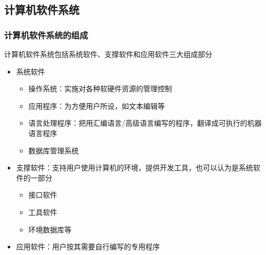 \documentclass[cs4size,a4paper,10pt]{ctexart}
\begin{document}
	\subsection{计算机软件系统}
	\subsubsection{计算机软件系统的组成}
	计算机软件系统包括系统软件、支撑软件和应用软件三大组成部分
	\begin{itemize}
		\item 系统软件
		\begin{itemize}
			\item 操作系统：实施对各种软硬件资源的管理控制
			\item 应用程序：为方便用户所设，如文本编辑等
			\item 语言处理程序：把用汇编语言/高级语言编写的程序，翻译成可执行的机器语言程序
			\item 数据库管理系统
		\end{itemize}
		\item 支撑软件：支持用户使用计算机的环境，提供开发工具，也可以认为是系统软件的一部分
		\begin{itemize}
			\item 接口软件
			\item 工具软件
			\item 环境数据库等
		\end{itemize}
		\item 应用软件：用户按其需要自行编写的专用程序
	\end{itemize}
\end{document}
